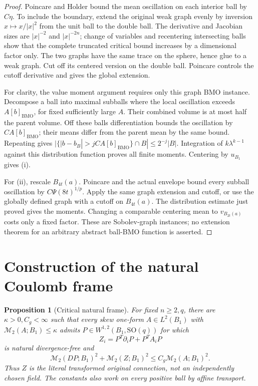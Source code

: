 \documentclass[reqno,11pt]{amsart}
\numberwithin{equation}{section}
\newtheorem{proposition}[theorem]{Proposition}
\theoremstyle{definition}
\theoremstyle{remark}
\newcommand{\SO}{\mathrm{SO}}
\newcommand{\BMO}{\mathrm{BMO}}
\newcommand{\M}{\mathcal M}
\begin{document}
\begin{proof}
Poincare and Holder bound the mean oscillation on each interior ball
by $C\eta$. To include the boundary, extend the original weak graph
evenly by inversion $x\mapsto x/|x|^2$ from the unit ball to the double
ball. The derivative and Jacobian sizes are $|x|^{-2}$ and $|x|^{-2n}$;
change of variables and recentering intersecting balls show that the
complete truncated critical bound increases by a dimensional factor
only. The two graphs have the same trace on the sphere, hence glue to
a weak graph. Cut off its centered version on the double ball.
Poincare controls the cutoff derivative and gives the global extension.

For clarity, the value moment argument requires only this graph BMO
instance. Decompose a ball into maximal subballs where the local
oscillation exceeds $A[b]_{\BMO}$, for fixed sufficiently large $A$.
Their combined volume is at most half the parent volume. Off these
balls differentiation bounds the oscillation by $C A[b]_{\BMO}$;
their means differ from the parent mean by the same bound. Repeating
gives
$|\{|b-b_B|>jC A[b]_{\BMO}\}\cap B|\leq2^{-j}|B|$.
Integration of $k\lambda^{k-1}$ against this distribution function
proves all finite moments. Centering by $u_{B_1}$ gives (i).

For (ii), rescale $B_{4t}(a)$. Poincare and the actual envelope bound
every subball oscillation by $C\Psi(8t)^{1/p}$. Apply the same graph
extension and cutoff, or use the globally defined graph with a cutoff
on $B_{4t}(a)$. The distribution estimate just proved gives the moments.
Changing a comparable centering mean to $v_{B_{2t}(a)}$ costs only a
fixed factor. These are Sobolev-graph instances; no extension theorem
for an arbitrary abstract ball-BMO function is asserted.
\end{proof}

\section{Construction of the natural Coulomb frame}\label{sec:gauge}
\begin{proposition}[Critical natural frame]\label{prop:gauge}
For fixed $n\geq2,q$, there are $\kappa>0,C_g<\infty$ such that
every skew one-form $A\in L^2(B_1)$ with $\M_2(A;B_1)\leq\kappa$
admits $P\in W^{1,2}(B_1,\SO(q))$ for which
\begin{equation}\label{eq:Z}
 Z_i=P^T\partial_iP+P^TA_iP
\end{equation}
is natural divergence-free and
\begin{equation}\label{eq:gauge-bound}
 \M_2(DP;B_1)^2+\M_2(Z;B_1)^2\leq C_g\M_2(A;B_1)^2.
\end{equation}
Thus $Z$ is the literal transformed original connection, not an
independently chosen field. The constants also work on every positive
ball by affine transport.
\end{proposition}
\end{document}
